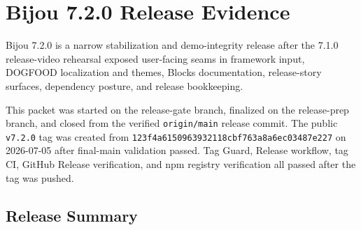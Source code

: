 \chapter{Bijou 7.2.0 Release Evidence}\label{record-261}

\smallskip

Bijou 7.2.0 is a narrow stabilization and demo-integrity release after the 7.1.0 release-video rehearsal exposed user-facing seams in framework input, DOGFOOD localization and themes, Blocks documentation, release-story surfaces, dependency posture, and release bookkeeping.

This packet was started on the release-gate branch, finalized on the release-prep branch, and closed from the verified \texttt{o\allowbreak{}r\allowbreak{}i\allowbreak{}g\allowbreak{}i\allowbreak{}n\allowbreak{}/\allowbreak{}m\allowbreak{}a\allowbreak{}i\allowbreak{}n} release commit. The public \texttt{v\allowbreak{}7\allowbreak{}.\allowbreak{}2\allowbreak{}.\allowbreak{}0} tag was created from \texttt{1\allowbreak{}2\allowbreak{}3\allowbreak{}f\allowbreak{}4\allowbreak{}a\allowbreak{}6\allowbreak{}1\allowbreak{}5\allowbreak{}0\allowbreak{}9\allowbreak{}6\allowbreak{}3\allowbreak{}9\allowbreak{}3\allowbreak{}2\allowbreak{}1\allowbreak{}1\allowbreak{}8\allowbreak{}c\allowbreak{}b\allowbreak{}f\allowbreak{}7\allowbreak{}6\allowbreak{}3\allowbreak{}a\allowbreak{}8\allowbreak{}a\allowbreak{}6\allowbreak{}e\allowbreak{}c\allowbreak{}0\allowbreak{}3\allowbreak{}4\allowbreak{}8\allowbreak{}7\allowbreak{}e\allowbreak{}2\allowbreak{}2\allowbreak{}7} on 2026-07-05 after final-main validation passed. Tag Guard, Release workflow, tag CI, GitHub Release verification, and npm registry verification all passed after the tag was pushed.

\section{Release Summary}\label{record-261-release-summary}

